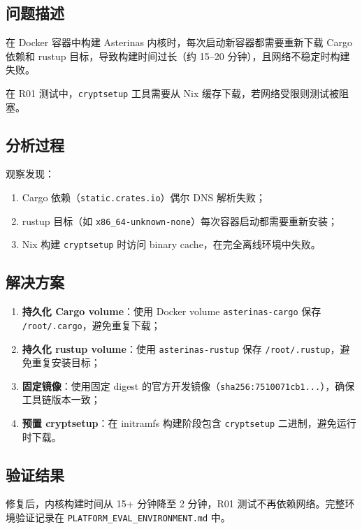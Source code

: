 \subsection{问题描述}

在 Docker 容器中构建 Asterinas 内核时，每次启动新容器都需要重新下载 Cargo 依赖和 rustup 目标，导致构建时间过长（约 15--20 分钟），且网络不稳定时构建失败。

在 R01 测试中，\texttt{cryptsetup} 工具需要从 Nix 缓存下载，若网络受限则测试被阻塞。

\subsection{分析过程}

观察发现：
\begin{enumerate}
    \item Cargo 依赖（\texttt{static.crates.io}）偶尔 DNS 解析失败；
    \item rustup 目标（如 \texttt{x86\_64-unknown-none}）每次容器启动都需要重新安装；
    \item Nix 构建 \texttt{cryptsetup} 时访问 binary cache，在完全离线环境中失败。
\end{enumerate}

\subsection{解决方案}

\begin{enumerate}
    \item \textbf{持久化 Cargo volume}：使用 Docker volume \texttt{asterinas-cargo} 保存 \texttt{/root/.cargo}，避免重复下载；
    \item \textbf{持久化 rustup volume}：使用 \texttt{asterinas-rustup} 保存 \texttt{/root/.rustup}，避免重复安装目标；
    \item \textbf{固定镜像}：使用固定 digest 的官方开发镜像（\texttt{sha256:7510071cb1...}），确保工具链版本一致；
    \item \textbf{预置 cryptsetup}：在 initramfs 构建阶段包含 \texttt{cryptsetup} 二进制，避免运行时下载。
\end{enumerate}

\subsection{验证结果}

修复后，内核构建时间从 15+ 分钟降至 2 分钟，R01 测试不再依赖网络。完整环境验证记录在 \texttt{PLATFORM\_EVAL\_ENVIRONMENT.md} 中。

